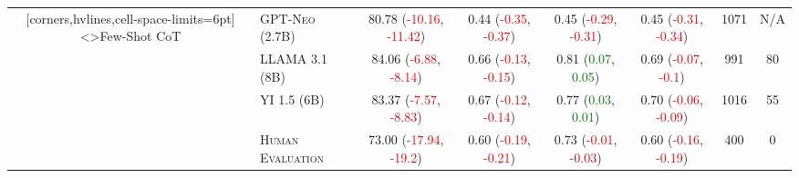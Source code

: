 \documentclass[twocolumn]{article}
\begin{document}
\begin{table}
\begin{NiceTabular}{cl*{6}{c}}[corners,hvlines,cell-space-limits=6pt]
<\rotate>{Few-Shot CoT}
	 & \textsc{GPT-Neo (2.7B)} & 80.78 (\textcolor{Red}{-10.16}, \textcolor{Red}{-11.42}) & 0.44 (\textcolor{Red}{-0.35}, \textcolor{Red}{-0.37}) & 0.45 (\textcolor{Red}{-0.29}, \textcolor{Red}{-0.31}) & 0.45 (\textcolor{Red}{-0.31}, \textcolor{Red}{-0.34}) & 1071 & N/A \\
	 & \textsc{LLAMA 3.1 (8B)} & 84.06 (\textcolor{Red}{-6.88}, \textcolor{Red}{-8.14}) & 0.66 (\textcolor{Red}{-0.13}, \textcolor{Red}{-0.15}) & 0.81 (\textcolor{Green}{0.07}, \textcolor{Green}{0.05}) & 0.69 (\textcolor{Red}{-0.07}, \textcolor{Red}{-0.1}) & 991 & 80 \\
	 & \textsc{YI 1.5 (6B)} & 83.37 (\textcolor{Red}{-7.57}, \textcolor{Red}{-8.83}) & 0.67 (\textcolor{Red}{-0.12}, \textcolor{Red}{-0.14}) & 0.77 (\textcolor{Green}{0.03}, \textcolor{Green}{0.01}) & 0.70 (\textcolor{Red}{-0.06}, \textcolor{Red}{-0.09}) & 1016 & 55 \\

	 & \textsc{Human Evaluation} & 73.00 (\textcolor{Red}{-17.94}, \textcolor{Red}{-19.2}) & 0.60 (\textcolor{Red}{-0.19}, \textcolor{Red}{-0.21}) & 0.73 (\textcolor{Red}{-0.01}, \textcolor{Red}{-0.03}) & 0.60 (\textcolor{Red}{-0.16}, \textcolor{Red}{-0.19}) & 400 & 0 \\

\end{NiceTabular}
\end{table}
\end{document}
